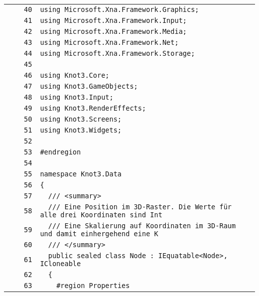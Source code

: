 \documentclass[a4paper,10pt]{article}
\begin{document}
\begin{longtable}[l]{lrrl}
\cellcolor{gray} &  & \verb~40~ & \verb~using Microsoft.Xna.Framework.Graphics;~\\
\cellcolor{gray} &  & \verb~41~ & \verb~using Microsoft.Xna.Framework.Input;~\\
\cellcolor{gray} &  & \verb~42~ & \verb~using Microsoft.Xna.Framework.Media;~\\
\cellcolor{gray} &  & \verb~43~ & \verb~using Microsoft.Xna.Framework.Net;~\\
\cellcolor{gray} &  & \verb~44~ & \verb~using Microsoft.Xna.Framework.Storage;~\\
\cellcolor{gray} &  & \verb~45~ & \verb~~\\
\cellcolor{gray} &  & \verb~46~ & \verb~using Knot3.Core;~\\
\cellcolor{gray} &  & \verb~47~ & \verb~using Knot3.GameObjects;~\\
\cellcolor{gray} &  & \verb~48~ & \verb~using Knot3.Input;~\\
\cellcolor{gray} &  & \verb~49~ & \verb~using Knot3.RenderEffects;~\\
\cellcolor{gray} &  & \verb~50~ & \verb~using Knot3.Screens;~\\
\cellcolor{gray} &  & \verb~51~ & \verb~using Knot3.Widgets;~\\
\cellcolor{gray} &  & \verb~52~ & \verb~~\\
\cellcolor{gray} &  & \verb~53~ & \verb~#endregion~\\
\cellcolor{gray} &  & \verb~54~ & \verb~~\\
\cellcolor{gray} &  & \verb~55~ & \verb~namespace Knot3.Data~\\
\cellcolor{gray} &  & \verb~56~ & \verb~{~\\
\cellcolor{gray} &  & \verb~57~ & \verb~  /// <summary>~\\
\cellcolor{gray} &  & \verb~58~ & \verb~  /// Eine Position im 3D-Raster. Die Werte für alle drei Koordinaten sind Int~\\
\cellcolor{gray} &  & \verb~59~ & \verb~  /// Eine Skalierung auf Koordinaten im 3D-Raum und damit einhergehend eine K~\\
\cellcolor{gray} &  & \verb~60~ & \verb~  /// </summary>~\\
\cellcolor{gray} &  & \verb~61~ & \verb~  public sealed class Node : IEquatable<Node>, ICloneable~\\
\cellcolor{gray} &  & \verb~62~ & \verb~  {~\\
\cellcolor{gray} &  & \verb~63~ & \verb~    #region Properties~\\

\end{longtable}
\end{document}
